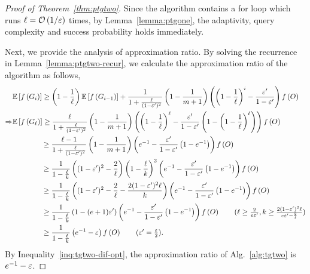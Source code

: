\thmptgtwo*
\begin{proof}[Proof of Theorem~\ref{thm:ptgtwo}]
Since the algorithm contains a for loop
which runs \ptgone $\ell = \mathcal O \left( 1/\varepsilon \right)$ times,
by Lemma~\ref{lemma:ptgone},
the adaptivity, query complexity and success probability holds immediately.

Next, we provide the analysis of approximation ratio.
By solving the recurrence in Lemma~\ref{lemma:ptgtwo-recur},
we calculate the approximation ratio of the algorithm as follows,
\begin{align*}
&\ex{\ff{G_{i}}}  \ge \left(1-\frac{1}{\ell}\right) \ex{\ff{G_{i-1}}}
+ \frac{1}{1+\frac{\ell}{(1-\epsi')^2}}\left(1-\frac{1}{m+1}\right)\left(\left(1-\frac{1}{\ell}\right)^i - \frac{\epsi'}{1-\epsi'}\right)\ff{O}\\
\Rightarrow& \ex{\ff{G_\ell}} \ge \frac{\ell}{1+\frac{\ell}{(1-\epsi')^2}}\left(1-\frac{1}{m+1}\right)\left(\left(1-\frac{1}{\ell}\right)^\ell - \frac{\epsi'}{1-\epsi'}\left(1-\left(1-\frac{1}{\ell}\right)^\ell\right)\right)\ff{O}\\
&\hspace*{4em} \ge \frac{\ell-1}{1+\frac{\ell}{(1-\epsi')^2}}\left(1-\frac{1}{m+1}\right)\left(e^{-1} - \frac{\epsi'}{1-\epsi'}\left(1-e^{-1}\right)\right)\ff{O}\\
&\hspace*{4em} \ge \frac{1}{1-\frac{\ell}{k}}\left((1-\epsi')^2 - \frac{2}{\ell}\right)\left(1-\frac{\ell}{k}\right)^2\left(e^{-1} - \frac{\epsi'}{1-\epsi'}\left(1-e^{-1}\right)\right) \ff{O}\\
&\hspace*{4em} \ge \frac{1}{1-\frac{\ell}{k}}\left((1-\epsi')^2 - \frac{2}{\ell}-\frac{2(1-\epsi')^2 \ell}{k}\right)\left(e^{-1} - \frac{\epsi'}{1-\epsi'}\left(1-e^{-1}\right)\right) \ff{O}\\
&\hspace*{4em} \ge \frac{1}{1-\frac{\ell}{k}} \left(1-(e+1)\epsi'\right)\left(e^{-1} - \frac{\epsi'}{1-\epsi'}\left(1-e^{-1}\right)\right) \ff{O}\tag{$\ell\ge \frac{2}{e\epsi'}, k\ge \frac{2(1-\epsi')^2\ell}{e\epsi'-\frac{2}{\ell}}$}\\
&\hspace*{4em} \ge \frac{1}{1-\frac{\ell}{k}} \left(e^{-1}-\epsi\right)\ff{O}\tag{$\epsi' = \frac{\epsi}{2}$}.
\end{align*}
By Inequality~\ref{inq:tgtwo-dif-opt},
the approximation ratio of Alg.~\ref{alg:tgtwo} is $e^{-1}-\varepsilon$.
\end{proof}














